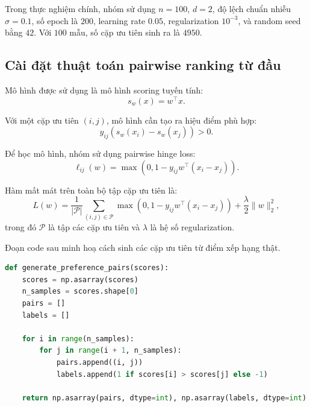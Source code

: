 Trong thực nghiệm chính, nhóm sử dụng \(n=100\), \(d=2\), độ lệch chuẩn nhiễu \(\sigma=0.1\), số epoch là \(200\), learning rate \(0.05\), regularization \(10^{-3}\), và random seed bằng \(42\). Với \(100\) mẫu, số cặp ưu tiên sinh ra là \(4950\).

\subsection{Cài đặt thuật toán pairwise ranking từ đầu}

Mô hình được sử dụng là mô hình scoring tuyến tính:
\begin{equation}
    s_w(x) = w^\top x.
    \label{eq:experiment-linear-scoring-function}
\end{equation}

Với một cặp ưu tiên \((i,j)\), mô hình cần tạo ra hiệu điểm phù hợp:
\[
    y_{ij}(s_w(x_i)-s_w(x_j))>0.
\]

Để học mô hình, nhóm sử dụng pairwise hinge loss:
\begin{equation}
    \ell_{ij}(w)
    =
    \max
    \left(
        0,
        1-y_{ij}w^\top(x_i-x_j)
    \right).
    \label{eq:experiment-pairwise-hinge-loss}
\end{equation}

Hàm mất mát trên toàn bộ tập cặp ưu tiên là:
\begin{equation}
    L(w)
    =
    \frac{1}{|\mathcal{P}|}
    \sum_{(i,j)\in\mathcal{P}}
    \max
    \left(
        0,
        1-y_{ij}w^\top(x_i-x_j)
    \right)
    +
    \frac{\lambda}{2}\|w\|_2^2,
    \label{eq:experiment-regularized-objective}
\end{equation}
trong đó \(\mathcal{P}\) là tập các cặp ưu tiên và \(\lambda\) là hệ số regularization.

Đoạn code sau minh hoạ cách sinh các cặp ưu tiên từ điểm xếp hạng thật.

\begin{lstlisting}[language=Python, caption={Sinh các cặp ưu tiên từ điểm xếp hạng thật}]
def generate_preference_pairs(scores):
    scores = np.asarray(scores)
    n_samples = scores.shape[0]
    pairs = []
    labels = []

    for i in range(n_samples):
        for j in range(i + 1, n_samples):
            pairs.append((i, j))
            labels.append(1 if scores[i] > scores[j] else -1)

    return np.asarray(pairs, dtype=int), np.asarray(labels, dtype=int)
\end{lstlisting}

